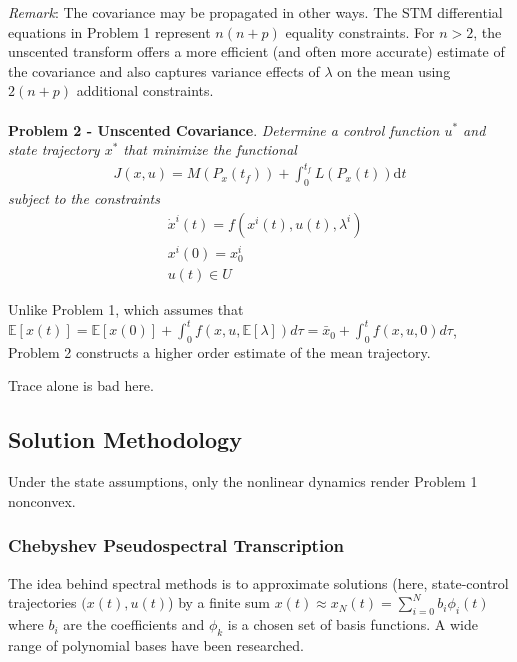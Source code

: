 \documentclass[10pt,a4paper]{article}
\begin{document}
	\textit{Remark}: The covariance may be propagated in other ways. The STM differential equations in Problem 1 represent $n(n+p)$ equality constraints. For $n>2$, the unscented transform offers a more efficient (and often more accurate) estimate of the covariance and also captures variance effects of $\lambda$ on the mean using $2(n+p)$ additional constraints.
	\\\\
	\textbf{Problem 2 - Unscented Covariance}. \textit{Determine a control function $ u^* $ and state trajectory $ x^* $ that minimize the functional}
		\begin{align}
		J(x,u) = M(P_x(t_f)) + \int_{0}^{t_f}L(P_x(t))\mathrm{d}t
		\end{align}
		\textit{	subject to the constraints }
		\begin{align}
		&\dot{x}^i(t) = f(x^i(t),u(t),\lambda^i) \\
		&x^i(0) = x^i_0 \\
		&u(t) \in U
		\end{align}
		
	Unlike Problem 1, which assumes that $\mathbb{E}[x(t)] = \mathbb{E}[x(0)] + \int_{0}^{t} f(x,u,\mathbb{E}[\lambda]) d\tau = \bar{x}_0 + \int_{0}^{t} f(x,u,0) d\tau$, Problem 2 constructs a higher order estimate of the mean trajectory.
	
	
	Trace alone is bad here.
	
	\subsection{Solution Methodology}
	Under the state assumptions, only the nonlinear dynamics render Problem 1 nonconvex.
	
	
	

	
	\subsubsection{Chebyshev Pseudospectral Transcription}
	The idea behind spectral methods is to approximate solutions (here, state-control trajectories $ (x(t),u(t) $) by a finite sum $x(t) \approx x_N(t) = \sum_{i=0}^{N}b_i\phi_i(t)$ where $b_i$ are the coefficients and $ {\phi_k} $ is a chosen set of basis functions. A wide range of polynomial bases have been researched. 
	
\end{document}
